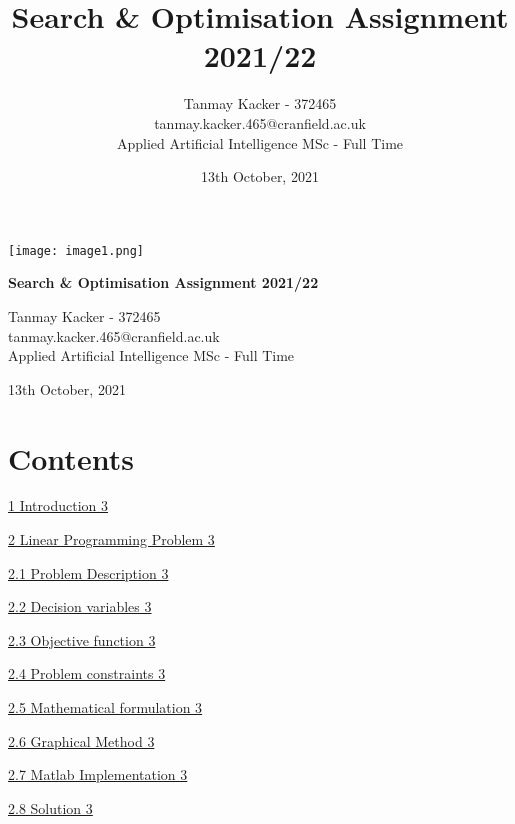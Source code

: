\documentclass[
]{article}
\title{Search \& Optimisation Assignment 2021/22}
\author{Tanmay Kacker - 372465 \\ tanmay.kacker.465@cranfield.ac.uk \\ Applied Artificial Intelligence MSc - Full Time}
\date{13th October, 2021}
\begin{document}
\begin{titlepage}
	\begin{center}
		\vspace*{1cm}
		          
		\texttt{[image: image1.png]}
		\vspace{2cm}
		
		\Huge
		\textbf{Search \& Optimisation Assignment 2021/22}
		          
		\vspace{0.5cm}
		\LARGE
		Tanmay Kacker - 372465 \\                       
		\Large
		\vspace{0.5cm}
		tanmay.kacker.465@cranfield.ac.uk \\
		Applied Artificial Intelligence MSc - Full Time \\
		
		\vspace{0.5cm}
		
		13th October, 2021          
		
	\end{center}
\end{titlepage}

\newpage

\hypertarget{contents}{%
	\section{Contents}\label{contents}}

\protect\hyperlink{_Toc84701452}{1 Introduction 3}

\protect\hyperlink{linear-programming-problem}{2 Linear Programming
Problem 3}

\protect\hyperlink{problem-description}{2.1 Problem Description 3}

\protect\hyperlink{decision-variables}{2.2 Decision variables 3}

\protect\hyperlink{objective-function}{2.3 Objective function 3}

\protect\hyperlink{problem-constraints}{2.4 Problem constraints 3}

\protect\hyperlink{mathematical-formulation}{2.5 Mathematical
formulation 3}

\protect\hyperlink{graphical-method}{2.6 Graphical Method 3}

\protect\hyperlink{matlab-implementation}{2.7 Matlab Implementation 3}

\protect\hyperlink{solution}{2.8 Solution 3}
\end{document}
